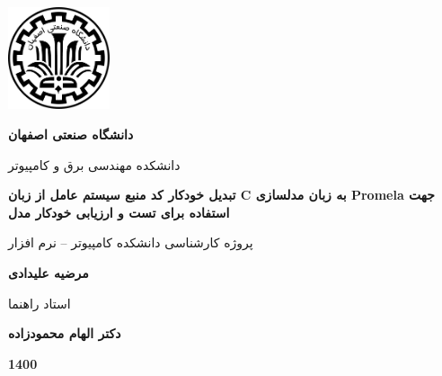 \thispagestyle{empty}
\begin{center}
\includegraphics[height=3cm]{iut_logo.png}
\vspace{0.4cm}

\textbf{دانشگاه صنعتی اصفهان}\\
\vspace{0.4cm}

{\large

	دانشکده مهندسی برق و کامپیوتر
}
\vspace{3.5cm}

{\Large
	\textbf{تبدیل خودکار کد ﻣﻨﺒﻊ ﺳﯿﺴﺘﻢ ﻋﺎﻣﻞ از زبان C ﺑﻪ زبان مدلسازی  Promela جهت استفاده برای تست و ارزیابی خودکار مدل}\\
}
\vspace{3.5cm}

{\Large
	پروژه کارشناسی دانشکده کامپیوتر -- نرم افزار\\
}
\vspace{1cm}

{\large
	\textbf{مرضیه علیدادی}\\
}
\vspace{3.5cm}

{\large
	استاد راهنما\\
}
\vspace{0.5cm}

{\large
	\textbf{دکتر الهام محمودزاده}\\
}
\vspace{3.5cm}

\textbf{1400}

\end{center}
\restoregeometry
\pagebreak









